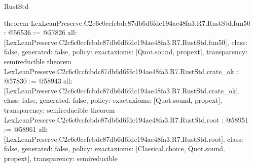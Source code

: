 \begin{lexlean}{RustStd}
\begin{coremodule}
{}
theorem LexLeanPreserve.C2c6c0ccfcbdc87db6d6fdc194ae48fa3.R7.RustStd.fun50 : @56536 := @57826 {
  all: [LexLeanPreserve.C2c6c0ccfcbdc87db6d6fdc194ae48fa3.R7.RustStd.fun50],
  class: false,
  generated: false,
  policy: exact{axioms: [Quot.sound, propext]},
  transparency: semireducible
}
theorem LexLeanPreserve.C2c6c0ccfcbdc87db6d6fdc194ae48fa3.R7.RustStd.crate_ok : @57830 := @58943 {
  all: [LexLeanPreserve.C2c6c0ccfcbdc87db6d6fdc194ae48fa3.R7.RustStd.crate_ok],
  class: false,
  generated: false,
  policy: exact{axioms: [Quot.sound, propext]},
  transparency: semireducible
}
theorem LexLeanPreserve.C2c6c0ccfcbdc87db6d6fdc194ae48fa3.R7.RustStd.root : @58951 := @58961 {
  all: [LexLeanPreserve.C2c6c0ccfcbdc87db6d6fdc194ae48fa3.R7.RustStd.root],
  class: false,
  generated: false,
  policy: exact{axioms: [Classical.choice, Quot.sound, propext]},
  transparency: semireducible
}


\end{coremodule}
\end{lexlean}
